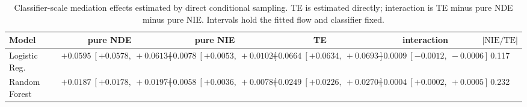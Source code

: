 \begin{table}[htbp]
  \centering
  \caption{Classifier-scale mediation effects estimated by direct conditional sampling. TE is estimated directly; interaction is TE minus pure NDE minus pure NIE. Intervals hold the fitted flow and classifier fixed.}
  \label{tab:german_gap_overall}
  \begin{tabular}{lccccc}
    \toprule
    Model & pure NDE & pure NIE & TE & interaction & $|\mathrm{NIE}/\mathrm{TE}|$ \\
    \midrule
    Logistic Reg. & $+0.0595\ [+0.0578,\ +0.0613]$ & $+0.0078\ [+0.0053,\ +0.0102]$ & $+0.0664\ [+0.0634,\ +0.0693]$ & $-0.0009\ [-0.0012,\ -0.0006]$ & 0.117 \\
    Random Forest & $+0.0187\ [+0.0178,\ +0.0197]$ & $+0.0058\ [+0.0036,\ +0.0078]$ & $+0.0249\ [+0.0226,\ +0.0270]$ & $+0.0004\ [+0.0002,\ +0.0005]$ & 0.232 \\
    \bottomrule
  \end{tabular}
\end{table}